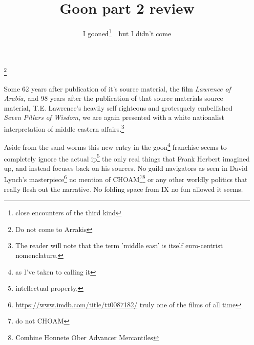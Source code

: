 \documentclass{article}
\title{Goon part 2 review}
\author{I gooned\footnote{close encounters of the third kind}\ \ but I didn't come}
\begin{document}
\maketitle

\noindent{}\footnote{Do not come to Arrakis}

\hfill \break

Some 62 years after publication of it's source material, the film \textit{Lawrence of Arabia}, and 98 years after the publication of that source materials source material, T.E. Lawrence's heavily self righteous and grotesquely embellished \textit{Seven Pillars of Wisdom}, we are again presented with a white nationalist interpretation of middle eastern affairs.\footnote{The reader will note that the term 'middle east' is itself euro-centrist nomenclature.}

Aside from the sand worms this new entry in the goon\footnote{as I've taken to calling it} franchise seems to completely ignore the actual ip\footnote{intellectual property,} the only real things that Frank Herbert imagined up, and instead focuses back on his sources. No guild navigators as seen in David Lynch's masterpiece\footnote{\href{https://www.imdb.com/title/tt0087182/}{https://www.imdb.com/title/tt0087182/} truly one of the films of all time} no mention of CHOAM\footnote{do not CHOAM}\footnote{Combine Honnete Ober Advancer Mercantiles} or any other worldly politics that really flesh out the narrative. No folding space from IX no fun allowed it seems.
\end{document}
